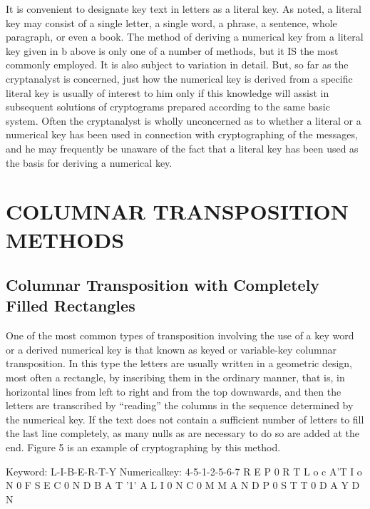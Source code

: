 \mypara It is convenient to designate key text in letters as a literal key. As
noted, a literal key may consist of a single letter, a single word, a phrase,
a sentence, whole paragraph, or even a book. The method of deriving
a numerical key from a literal key given in b above is only one of a number of methods, but it IS the most commonly employed. It is also subject to
variation in detail. But, so far as the cryptanalyst is concerned, just how
the numerical key is derived from a specific literal key is usually of
interest to him only if this knowledge will assist in subsequent solutions
of cryptograms prepared according to the same basic system. Often the
cryptanalyst is wholly unconcerned as to whether a literal or a numerical
key has been used in connection with cryptographing of the messages,
and he may frequently be unaware of the fact that a literal key has been
used as the basis for deriving a numerical key.

\section{COLUMNAR TRANSPOSITION METHODS}

\subsection{Columnar Transposition with Completely Filled Rectangles}

\mypara One of the most common types of transposition involving the use
of a key word or a derived numerical key is that known as keyed or
variable-key columnar transposition. In this type the letters are usually
written in a geometric design, most often a rectangle, by inscribing them
in the ordinary manner, that is, in horizontal lines from left to right and
from the top downwards, and then the letters are transcribed by
“reading” the columns in the sequence determined by the numerical key.
If the text does not contain a sufficient number of letters to fill the last
line completely, as many nulls as are necessary to do so are added at the
end. Figure 5 is an example of cryptographing by this method.

 

 

 

 

 

 

 

Keyword: L-I-B-E-R-T-Y
Numericalkey: 4-5-1-2-5-6-7
R E P 0 R T L
o c A'T I o N
0 F S E C 0 N
D B A T '1' A L
I 0 N C 0 M M
A N D P 0 S T
T 0 D A Y D N

